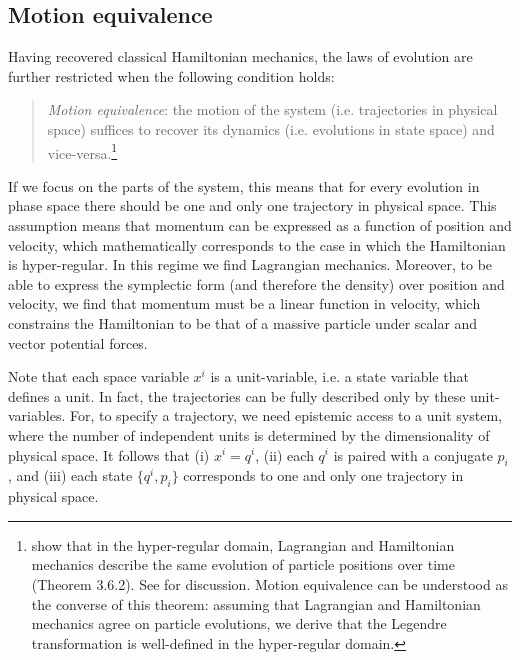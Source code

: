 \documentclass[12pt, twoside]{article}
\newcommand\bs{\begin{singlespace}}
\newcommand\es{\end{singlespace}}
\begin{document}



\subsection{Motion equivalence}
\label{motion}

Having recovered classical Hamiltonian mechanics, the laws of evolution are further restricted when the following condition holds:


\begin{quotation}
\bs \noindent
\textit{Motion equivalence}: the motion of the system (i.e. trajectories in physical space) suffices to recover its dynamics (i.e. evolutions in state space) and vice-versa.\footnote{ \textcites[218]{Abraham} show that in the hyper-regular domain, Lagrangian and Hamiltonian mechanics describe the same evolution of particle positions over time (Theorem 3.6.2). See \textcites[1180-1181]{Barrett2} for discussion. Motion equivalence can be understood as the converse of this theorem: assuming that Lagrangian and Hamiltonian mechanics agree on particle evolutions, we derive that the Legendre transformation is well-defined in the hyper-regular domain.} \es
\end{quotation}


\noindent If we focus on the parts of the system, this means that for every evolution in phase space there should be one and only one trajectory in physical space. {\color{green}This assumption means that momentum can be expressed as a function of position and velocity, which mathematically corresponds to the case in which the Hamiltonian is hyper-regular. In this regime we find Lagrangian mechanics. Moreover, to be able to express the symplectic form (and therefore the density) over position and velocity, we find that momentum must be a linear function in velocity, which constrains the Hamiltonian to be that of a massive particle under scalar and vector potential forces.}

Note that each space variable $x^i$ is a unit-variable, i.e. a state variable that defines a unit. In fact, the trajectories can be fully described only by these unit-variables. For, to specify a trajectory, we need epistemic access to a unit system, where the number of independent units is determined by the dimensionality of physical space. It follows that (i) $x^i = q^i$, (ii) each $q^i$ is paired with a conjugate $p_i$, and (iii) each state $\{q^i, p_i\}$ corresponds to one and only one trajectory in physical space. 
\end{document}
